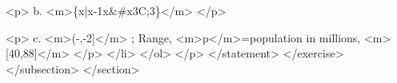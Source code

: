                             <p>
                                b.
                                <m>\{x|x-1\leq x&#x3C;3\}</m>
                            </p>

                            <p>
                                c.
                                <m>(-\infty,-2]\cup[-1,3)</m>
                            </p>
                        </li>

                        <li>
                            <p>
                                Domain; <m>y</m>=years, <m>[1952,2002]</m> ; Range, <m>p</m>=population in millions, <m>[40,88]</m>
                            </p>
                        </li>
                    </ol>
                </p>
            </statement>
        </exercise>
    </subsection>
</section>